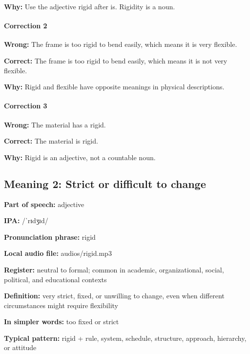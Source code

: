 \documentclass[11pt]{article}
\begin{document}
\textbf{Why:} Use the adjective rigid after is. Rigidity is a noun.

\paragraph{Correction 2}
\textbf{Wrong:} The frame is too rigid to bend easily, which means it is very flexible.

\textbf{Correct:} The frame is too rigid to bend easily, which means it is not very flexible.

\textbf{Why:} Rigid and flexible have opposite meanings in physical descriptions.

\paragraph{Correction 3}
\textbf{Wrong:} The material has a rigid.

\textbf{Correct:} The material is rigid.

\textbf{Why:} Rigid is an adjective, not a countable noun.

\subsection{Meaning 2: Strict or difficult to change}
\textbf{Part of speech:} adjective

\textbf{IPA:} /ˈrɪdʒɪd/

\textbf{Pronunciation phrase:} rigid

\textbf{Local audio file:} audios/rigid.mp3

\textbf{Register:} neutral to formal; common in academic, organizational, social, political, and educational contexts

\textbf{Definition:} very strict, fixed, or unwilling to change, even when different circumstances might require flexibility

\textbf{In simpler words:} too fixed or strict

\textbf{Typical pattern:} rigid + rule, system, schedule, structure, approach, hierarchy, or attitude
\end{document}

